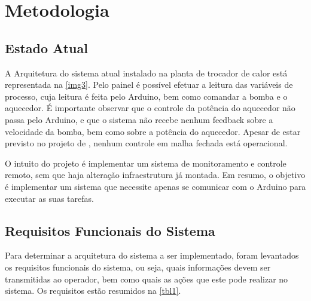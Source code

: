 \chapter{Metodologia}
	
	\section{Estado Atual}
	
		A Arquitetura do sistema atual instalado na planta de trocador de calor está representada na \autoref{img3}. Pelo painel é possível efetuar a leitura das variáveis de processo, cuja leitura é feita pelo Arduino, bem como comandar a bomba e o aquecedor. É importante observar que o controle da potência do aquecedor não passa pelo Arduino, e que o sistema não recebe nenhum feedback sobre a velocidade da bomba, bem como sobre a potência do aquecedor. Apesar de estar previsto no projeto de \textcite{luiz2016}, nenhum controle em malha fechada está operacional.
		
		
	
		O intuito do projeto é implementar um sistema de monitoramento e controle remoto, sem que haja alteração infraestrutura já montada. Em resumo, o objetivo é implementar um sistema que necessite apenas se comunicar com o Arduino para executar as suas tarefas.
	
	
	\section{Requisitos Funcionais do Sistema}
		Para determinar a arquitetura do sistema a ser implementado, foram levantados os requisitos funcionais do sistema, ou seja, quais informações devem ser transmitidas ao operador, bem como quais as ações que este pode realizar no sistema. Os requisitos estão resumidos na \autoref{tbl1}.
		

